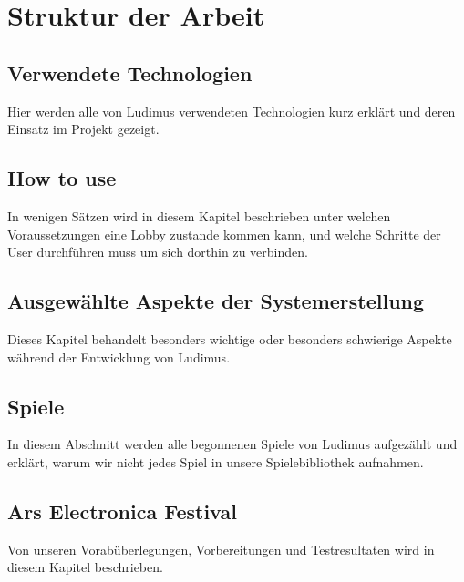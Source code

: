 \section{Struktur der Arbeit}
\subsection{Verwendete Technologien}
Hier werden alle von Ludimus verwendeten Technologien kurz erklärt und deren Einsatz im Projekt gezeigt. 
\subsection{How to use}
In wenigen Sätzen wird in diesem Kapitel beschrieben unter welchen Voraussetzungen eine Lobby zustande kommen kann, und welche Schritte der User durchführen muss um sich dorthin zu verbinden.
\subsection{Ausgewählte Aspekte der Systemerstellung}
Dieses Kapitel behandelt besonders wichtige oder besonders schwierige Aspekte während der Entwicklung von Ludimus. 
\subsection{Spiele}
In diesem Abschnitt werden alle begonnenen Spiele von Ludimus aufgezählt und erklärt, warum wir nicht jedes Spiel in unsere Spielebibliothek aufnahmen.
\subsection{Ars Electronica Festival}
Von unseren Vorabüberlegungen, Vorbereitungen und Testresultaten wird in diesem Kapitel beschrieben. 